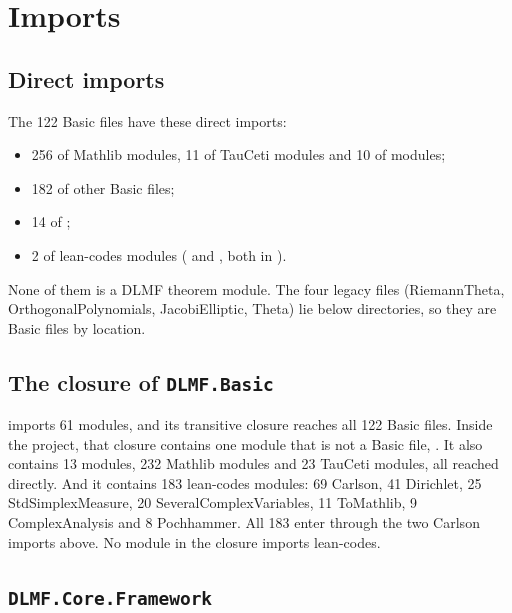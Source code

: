 \documentclass[11pt,a4paper]{article}
\begin{document}
\section{Imports}\label{sec:imports}

\subsection{Direct imports}

The 122 Basic files have these direct imports:

\begin{itemize}
  \item 256 of Mathlib modules, 11 of TauCeti modules and 10 of  modules;
  \item 182 of other Basic files;
  \item 14 of ;
  \item 2 of lean-codes modules ( and
    , both in
    ).
\end{itemize}

None of them is a DLMF theorem module. The four legacy files 
(RiemannTheta, OrthogonalPolynomials, JacobiElliptic, Theta) lie below 
directories, so they are Basic files by location.

\subsection{The closure of \texorpdfstring{\texttt{DLMF.Basic}}{DLMF.Basic}}

 imports 61 modules, and its transitive closure reaches all 122 Basic files.
Inside the project, that closure contains one module that is not a Basic file,
. It also contains 13  modules, 232 Mathlib
modules and 23 TauCeti modules, all reached directly. And it contains 183 lean-codes modules: 69
Carlson, 41 Dirichlet, 25 StdSimplexMeasure, 20 SeveralComplexVariables, 11 ToMathlib, 9
ComplexAnalysis and 8 Pochhammer. All 183 enter through the two Carlson imports above. No
 module in the closure imports lean-codes.

\subsection{\texorpdfstring{\texttt{DLMF.Core.Framework}}{DLMF.Core.Framework}}
\end{document}
